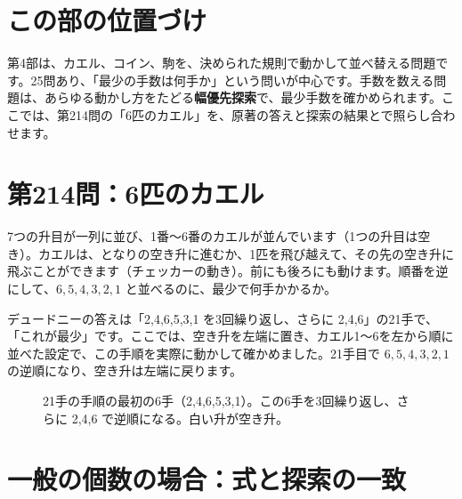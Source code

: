 \documentclass[a4paper,11pt,openany]{ltjsbook}
\begin{document}
\section{この部の位置づけ}

第4部は、カエル、コイン、駒を、決められた規則で動かして並べ替える問題です。25問あり、「最少の手数は何手か」という問いが中心です。手数を数える問題は、あらゆる動かし方をたどる\textbf{幅優先探索}で、最少手数を確かめられます。ここでは、第214問の「6匹のカエル」を、原著の答えと探索の結果とで照らし合わせます。

\section{第214問：6匹のカエル}

7つの升目が一列に並び、1番〜6番のカエルが並んでいます（1つの升目は空き）。カエルは、となりの空き升に進むか、1匹を飛び越えて、その先の空き升に飛ぶことができます（チェッカーの動き）。前にも後ろにも動けます。順番を逆にして、$6,5,4,3,2,1$ と並べるのに、最少で何手かかるか。

デュードニーの答えは「2,4,6,5,3,1 を3回繰り返し、さらに 2,4,6」の21手で、「これが最少」です。ここでは、空き升を左端に置き、カエル1〜6を左から順に並べた設定で、この手順を実際に動かして確かめました。21手目で $6,5,4,3,2,1$ の逆順になり、空き升は左端に戻ります。

\begin{figure}[htbp]
\centering
{}
\caption{21手の手順の最初の6手（2,4,6,5,3,1）。この6手を3回繰り返し、さらに 2,4,6 で逆順になる。白い升が空き升。}
\end{figure}

\section{一般の個数の場合：式と探索の一致}
\end{document}
